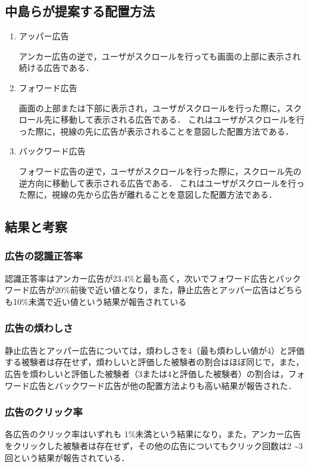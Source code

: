 \documentclass[12pt,a4j,titlepage]{ltjsarticle}
\begin{document}
\subsection{中島らが提案する配置方法}
\label{subsec:nh}
\begin{enumerate}[i]
\item アッパー広告

アンカー広告の逆で，ユーザがスクロールを行っても画面の上部に表示され続ける広告である．

\item フォワード広告

画面の上部または下部に表示され，ユーザがスクロールを行った際に，スクロール先に移動して表示される広告である．
これはユーザがスクロールを行った際に，視線の先に広告が表示されることを意図した配置方法である．

\item バックワード広告

フォワード広告の逆で，ユーザがスクロールを行った際に，スクロール先の逆方向に移動して表示される広告である．
これはユーザがスクロールを行った際に，視線の先から広告が離れることを意図した配置方法である．
\end{enumerate}

\subsection{結果と考察}
\subsubsection{広告の認識正答率}
認識正答率はアンカー広告が23.4\%と最も高く，次いでフォワード広告とバックワード広告が20\%前後で近い値となり，また，静止広告とアッパー広告はどちらも10\%未満で近い値という結果が報告されている

\subsubsection{広告の煩わしさ}
静止広告とアッパー広告については，煩わしさを4（最も煩わしい値が4）と評価する被験者は存在せず，煩わしいと評価した被験者の割合はほぼ同じで，また，広告を煩わしいと評価した被験者（3または4と評価した被験者）の割合は，フォワード広告とバックワード広告が他の配置方法よりも高い結果が報告された．

\subsubsection{広告のクリック率}
各広告のクリック率はいずれも 1\%未満という結果になり，また，アンカー広告をクリックした被験者は存在せず，その他の広告についてもクリック回数は2 \textasciitilde 3回という結果が報告されている．
\end{document}
